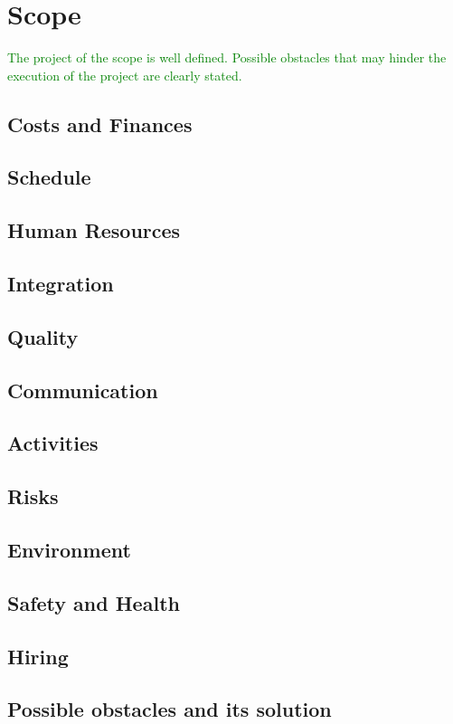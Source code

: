 
\chapter{Scope} %

\label{Chapter2} %

\textcolor{green}{The project of the scope is well defined. Possible obstacles that may hinder the execution of the project are clearly stated.}

\section{Costs and Finances}
\section{Schedule}
\section{Human Resources}
\section{Integration}
\section{Quality}
\section{Communication}
\section{Activities}
\section{Risks}
\section{Environment}
\section{Safety and Health}
\section{Hiring}

\section{Possible obstacles and its solution}